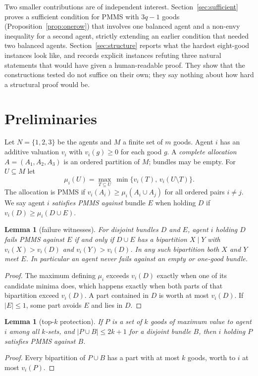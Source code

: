 \documentclass[11pt,a4paper]{article}
\newtheorem{lemma}[theorem]{Lemma}
\theoremstyle{remark}
\newcommand{\mms}{\mu}
\begin{document}
Two smaller contributions are of independent interest. Section~\ref{sec:sufficient} proves a sufficient condition for PMMS with $3q-1$ goods (Proposition~\ref{prop:onerow}) that involves one balanced agent and a non-envy inequality for a second agent, strictly extending an earlier condition that needed two balanced agents. Section~\ref{sec:structure} reports what the hardest eight-good instances look like, and records explicit instances refuting three natural statements that would have given a human-readable proof. They show that the constructions tested do not suffice on their own; they say nothing about how hard a structural proof would be.

\section{Preliminaries}\label{sec:prelim}

Let $N=\{1,2,3\}$ be the agents and $M$ a finite set of $m$ goods. Agent $i$ has an additive valuation $v_i$ with $v_i(g)\ge 0$ for each good $g$. A \emph{complete allocation} $A=(A_1,A_2,A_3)$ is an ordered partition of $M$; bundles may be empty. For $U\subseteq M$ let
\[
\mms_i(U)=\max_{T\subseteq U}\ \min\{v_i(T),\,v_i(U\setminus T)\}.
\]
The allocation is PMMS if $v_i(A_i)\ge \mms_i(A_i\cup A_j)$ for all ordered pairs $i\ne j$. We say agent $i$ \emph{satisfies PMMS against} bundle $E$ when holding $D$ if $v_i(D)\ge\mms_i(D\cup E)$.

\begin{lemma}[failure witnesses]\label{lem:witness}
For disjoint bundles $D$ and $E$, agent $i$ holding $D$ fails PMMS against $E$ if and only if $D\cup E$ has a bipartition $X\mid Y$ with $v_i(X)>v_i(D)$ and $v_i(Y)>v_i(D)$. In any such bipartition both $X$ and $Y$ meet $E$. In particular an agent never fails against an empty or one-good bundle.
\end{lemma}
\begin{proof}
The maximum defining $\mms_i$ exceeds $v_i(D)$ exactly when one of its candidate minima does, which happens exactly when both parts of that bipartition exceed $v_i(D)$. A part contained in $D$ is worth at most $v_i(D)$. If $|E|\le 1$, some part avoids $E$ and lies in $D$.
\end{proof}

\begin{lemma}[top-$k$ protection]\label{lem:topk}
If $P$ is a set of $k$ goods of maximum value to agent $i$ among all $k$-sets, and $|P\cup B|\le 2k+1$ for a disjoint bundle $B$, then $i$ holding $P$ satisfies PMMS against $B$.
\end{lemma}
\begin{proof}
Every bipartition of $P\cup B$ has a part with at most $k$ goods, worth to $i$ at most $v_i(P)$.
\end{proof}
\end{document}
